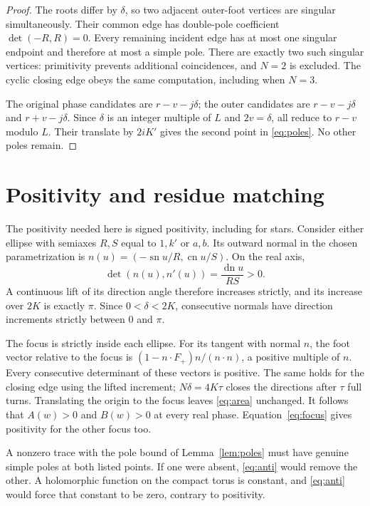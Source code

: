 \documentclass[11pt]{article}
\newcommand{\sn}{\operatorname{sn}}
\newcommand{\cn}{\operatorname{cn}}
\newcommand{\dn}{\operatorname{dn}}
\begin{document}
\begin{proof}
The roots differ by $\delta$, so two adjacent outer-foot vertices
are singular simultaneously. Their common edge has double-pole
coefficient $\det(-R,R)=0$. Every remaining incident edge has at
most one singular endpoint and therefore at most a simple pole.
There are exactly two such singular vertices: primitivity prevents
additional coincidences, and $N=2$ is excluded. The cyclic closing
edge obeys the same computation, including when $N=3$.

The original phase candidates are $r-v-j\delta$; the outer
candidates are $r-v-j\delta$ and $r+v-j\delta$.
Since $\delta$ is an integer multiple of $L$ and $2v=\delta$,
all reduce to $r-v$ modulo $L$. Their translate by $2iK'$ gives
the second point in \eqref{eq:poles}. No other poles remain.
\end{proof}

\section{Positivity and residue matching}
The positivity needed here is signed positivity, including for stars.
Consider either ellipse with semiaxes $R,S$ equal to $1,k'$ or $a,b$.
Its outward normal in the chosen parametrization is
$n(u)=(-\sn u/R,\cn u/S)$. On the real axis,
\begin{equation}\label{eq:normal}
 \det(n(u),n'(u))=\frac{\dn u}{RS}>0.
\end{equation}
A continuous lift of its direction angle therefore increases strictly,
and its increase over $2K$ is exactly $\pi$. Since
$0<\delta<2K$, consecutive normals have direction increments
strictly between $0$ and $\pi$.

The focus is strictly inside each ellipse. For its tangent with normal
$n$, the foot vector relative to the focus is
$(1-n\cdot F_+)n/(n\cdot n)$, a positive multiple of $n$.
Every consecutive determinant of these vectors is positive. The same
holds for the closing edge using the lifted increment;
$N\delta=4K\tau$ closes the directions after $\tau$ full turns.
Translating the origin to the focus leaves \eqref{eq:area} unchanged.
It follows that $A(w)>0$ and $B(w)>0$ at every real phase.
Equation~\eqref{eq:focus} gives positivity for the other focus too.

A nonzero trace with the pole bound of Lemma~\ref{lem:poles}
must have genuine simple poles at both listed points. If one were
absent, \eqref{eq:anti} would remove the other. A holomorphic function
on the compact torus is constant, and \eqref{eq:anti} would force
that constant to be zero, contrary to positivity.
\end{document}
